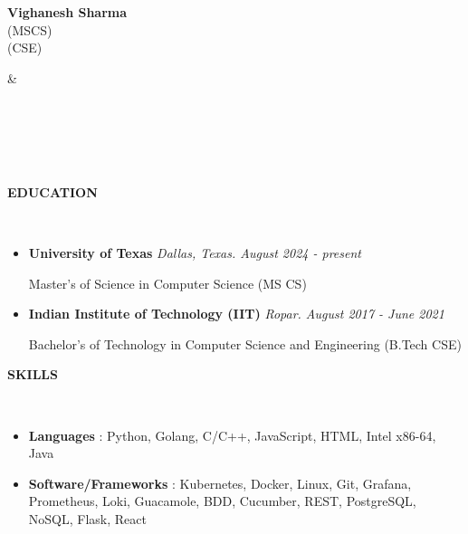 \documentclass[a4paper,10pt]{article}
\newcommand{\lsep}{-0.6cm}
\newcommand{\resheading}[1]{{\small \colorbox{mygrey}{\begin{minipage}{0.975\textwidth}{\textbf{#1 \vphantom{p\^{E}}}}\end{minipage}}}}
\begin{document}

\begin{minipage}{0.5\linewidth}
\textbf{\Large Vighanesh Sharma}\\
 (MSCS)\\
 (CSE)\\
\end{minipage}
&\hspace{2cm}
\begin{minipage}{0.5\linewidth}
\\
\\
\\
 \\
\end{minipage}
\vspace{-8.0pt}


\resheading{\textbf{EDUCATION} }\\[\lsep]
\vspace{1.0pt}
\begin{itemize}
\item \textbf{University of Texas} \hfill \emph{Dallas, Texas. August 2024 - present}
\setlength{\itemsep}{1pt}
\setlength{\parskip}{0pt}
\setlength{\parsep}{0pt}

Master's of Science in Computer Science (MS CS)

\item \textbf{Indian Institute of Technology (IIT)} \hfill \emph{Ropar. August 2017 - June 2021}
\setlength{\itemsep}{1pt}
\setlength{\parskip}{0pt}
\setlength{\parsep}{0pt}

Bachelor's of Technology in Computer Science and Engineering (B.Tech CSE)

\end{itemize}
\vspace{-5pt}

\resheading{\textbf{SKILLS} }\\[\lsep]
\vspace{1.0pt}
\begin{itemize}[itemsep=0.1pt]

\item \noindent \textbf{Languages} : Python, Golang, C/C++, JavaScript, HTML, Intel x86-64, Java
\item \noindent \textbf{Software/Frameworks} : Kubernetes, Docker, Linux, Git, Grafana, Prometheus, Loki, Guacamole, BDD, Cucumber, REST, PostgreSQL, NoSQL, Flask, React
\end{itemize}
\vspace{-5pt}
\end{document}
